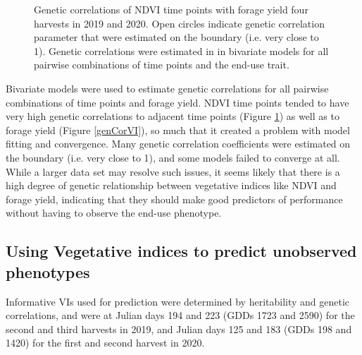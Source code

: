 \documentclass[12pt, letterpaper]{article}
\begin{document}
\begin{figure}
\begin{tikzpicture}
 \end{tikzpicture}
\caption{Genetic correlations of NDVI time points with forage yield four harvests in 2019 and 2020. Open circles indicate genetic correlation parameter that were estimated on the boundary (i.e. very close to 1). Genetic correlations were estimated in in bivariate models for all pairwise combinations of time points and the end-use trait.}
\label{genCorVItraits}
\end{figure}


Bivariate models were used to estimate genetic correlations for all pairwise combinations of time points and forage yield. NDVI time points tended to have very high genetic correlations to adjacent time points (Figure \ref{genCorVItraits}) as well as to forage yield (Figure \ref{genCorVI}), so much that it created a problem with model fitting and convergence. Many genetic correlation coefficients were estimated on the boundary (i.e. very close to 1), and some models failed to converge at all. While a larger data set may resolve such issues, it seems likely that there is a high degree of genetic relationship between vegetative indices like NDVI and forage yield, indicating that they should make good predictors of performance without having to observe the end-use phenotype. 




\subsection{Using Vegetative indices to predict unobserved phenotypes}

Informative VIs used for prediction were determined by heritability and genetic correlations, and were at Julian days 194 and 223 (GDDs 1723 and 2590) for the second and third harvests in 2019, and Julian days 125 and 183 (GDDs 198 and 1420) for the first and second harvest in 2020. 
\end{document}

